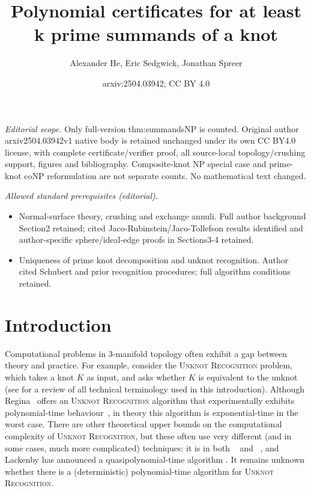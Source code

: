 \documentclass[10pt,a4paper]{amsart}
\title{Polynomial certificates for at least k prime summands of a knot}
\author{Alexander He, Eric Sedgwick, Jonathan Spreer}
\date{arxiv:2504.03942; CC BY 4.0}
\begin{document}
\maketitle
\noindent\textit{Editorial scope.} Only full-version thm:summandsNP is counted. Original author arxiv2504.03942v1 native body is retained unchanged under its own CC BY4.0 license, with complete certificate/verifier proof, all source-local topology/crushing support, figures and bibliography. Composite-knot NP special case and prime-knot coNP reformulation are not separate counts. No mathematical text changed.\par\medskip
\noindent\textit{Allowed standard prerequisites (editorial).}\begin{itemize}
\item Normal-surface theory, crushing and exchange annuli. Full author background Section2 retained; cited Jaco-Rubinstein/Jaco-Tollefson results identified and author-specific sphere/ideal-edge proofs in Sections3-4 retained.
\item Uniqueness of prime knot decomposition and unknot recognition. Author cited Schubert and prior recognition procedures; full algorithm conditions retained.
\end{itemize}\medskip
\section{Introduction}\label{sec:intro}

Computational problems in $3$-manifold topology often exhibit a gap between theory and practice.
For example, consider the \textsc{Unknot Recognition} problem, which takes a knot $K$ as input, and asks whether $K$ is equivalent to the unknot (see  for a review of all technical terminology used in this introduction).
Although Regina~\cite{Regina} offers an \textsc{Unknot Recognition} algorithm that experimentally exhibits polynomial-time behaviour~\cite{burton2012unknot},
in theory this algorithm is exponential-time in the worst case.
There are other theoretical upper bounds on the computational complexity of \textsc{Unknot Recognition}, but these often use very different (and in some cases, much more complicated) techniques:
it is in both \NP~\cite{hass1999computational} and \coNP~\cite{kuperberg2014knottedness,lackenby2016efficient},
and Lackenby has announced a quasipolynomial-time algorithm \cite{LackenbyTalk}.
It remains unknown whether there is a (deterministic) polynomial-time algorithm for \textsc{Unknot Recognition}.
\end{document}
